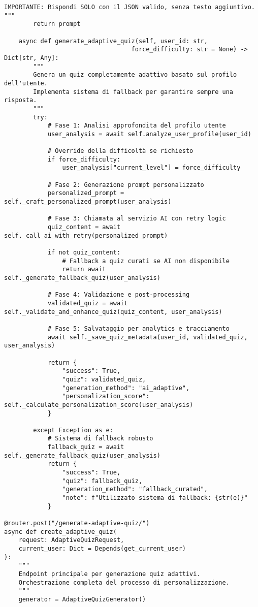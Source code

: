 \documentclass[a4paper, 14pt, oneside]{extbook}
\begin{document}
\begin{lstlisting}[style=pythonstyle, caption=Generatore Quiz Adattivo - Logica Avanzata, label=lst:adaptive-quiz]
IMPORTANTE: Rispondi SOLO con il JSON valido, senza testo aggiuntivo.
"""
        return prompt
    
    async def generate_adaptive_quiz(self, user_id: str, 
                                   force_difficulty: str = None) -> Dict[str, Any]:
        """
        Genera un quiz completamente adattivo basato sul profilo dell'utente.
        Implementa sistema di fallback per garantire sempre una risposta.
        """
        try:
            # Fase 1: Analisi approfondita del profilo utente
            user_analysis = await self.analyze_user_profile(user_id)
            
            # Override della difficoltà se richiesto
            if force_difficulty:
                user_analysis["current_level"] = force_difficulty
            
            # Fase 2: Generazione prompt personalizzato
            personalized_prompt = self._craft_personalized_prompt(user_analysis)
            
            # Fase 3: Chiamata al servizio AI con retry logic
            quiz_content = await self._call_ai_with_retry(personalized_prompt)
            
            if not quiz_content:
                # Fallback a quiz curati se AI non disponibile
                return await self._generate_fallback_quiz(user_analysis)
            
            # Fase 4: Validazione e post-processing
            validated_quiz = await self._validate_and_enhance_quiz(quiz_content, user_analysis)
            
            # Fase 5: Salvataggio per analytics e tracciamento
            await self._save_quiz_metadata(user_id, validated_quiz, user_analysis)
            
            return {
                "success": True,
                "quiz": validated_quiz,
                "generation_method": "ai_adaptive",
                "personalization_score": self._calculate_personalization_score(user_analysis)
            }
            
        except Exception as e:
            # Sistema di fallback robusto
            fallback_quiz = await self._generate_fallback_quiz(user_analysis)
            return {
                "success": True,
                "quiz": fallback_quiz,
                "generation_method": "fallback_curated",
                "note": f"Utilizzato sistema di fallback: {str(e)}"
            }

@router.post("/generate-adaptive-quiz/")
async def create_adaptive_quiz(
    request: AdaptiveQuizRequest,
    current_user: Dict = Depends(get_current_user)
):
    """
    Endpoint principale per generazione quiz adattivi.
    Orchestrazione completa del processo di personalizzazione.
    """
    generator = AdaptiveQuizGenerator()
    

\end{lstlisting}
\end{document}
